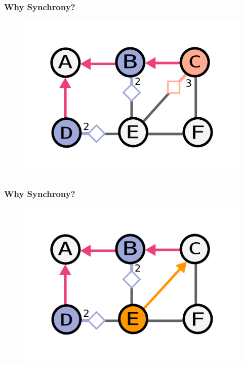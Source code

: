 \documentclass{beamer}
\begin{document}
\begin{frame}
    \frametitle{Why Synchrony?}
    \begin{figure}
    \includegraphics[width=0.5\paperwidth]{round3-fuckup.pdf}
    \end{figure}
\end{frame}


\begin{frame}
    \frametitle{Why Synchrony?}
    \begin{figure}
    \includegraphics[width=0.5\paperwidth]{round3-fuckup-end.pdf}
    \end{figure}
\end{frame}
\end{document}
